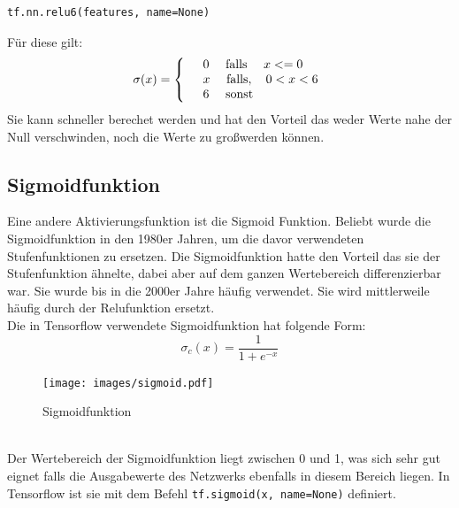 \begin{lstlisting}
tf.nn.relu6(features, name=None)
\end{lstlisting}
Für diese gilt:
\begin{align*}
	\sigma(x)=
	\left\{
	\begin{array}{l l}
		& 0 \quad \text{   falls  } \quad x <= 0  \\ 
		& x \quad \text{   falls},\quad 0 < x < 6 \\
		& 6 \quad \text{   sonst}
	\end{array}
	\right.
\end{align*}
Sie kann schneller berechet werden und hat den Vorteil das weder Werte nahe der Null verschwinden, noch die Werte zu gro\ss werden können.\cite{cookbook} 
\subsection{Sigmoidfunktion}
Eine andere Aktivierungsfunktion ist die Sigmoid Funktion. Beliebt wurde die Sigmoidfunktion in den 1980er Jahren, um die davor verwendeten Stufenfunktionen zu ersetzen. Die Sigmoidfunktion hatte den Vorteil das sie der Stufenfunktion ähnelte, dabei aber auf dem ganzen Wertebereich differenzierbar war. Sie wurde bis in die 2000er Jahre häufig verwendet. Sie wird mittlerweile häufig durch der Relufunktion ersetzt. \cite{Goodfellow} \\
Die in Tensorflow verwendete Sigmoidfunktion hat folgende Form:\cite{cookbook}
\begin{equation}
\sigma_c(x)=\frac{1}{1+e^{-x}}
\end{equation}
\begin{figure}[!htp]
	\centering
	\texttt{[image: images/sigmoid.pdf]}
	\caption{Sigmoidfunktion \cite{building}}
\end{figure}\\
Der Wertebereich der Sigmoidfunktion liegt zwischen 0 und 1, was sich sehr gut eignet falls die Ausgabewerte des Netzwerks ebenfalls in diesem Bereich liegen. In Tensorflow ist sie mit dem Befehl \lstinline$tf.sigmoid(x, name=None)$\cite{building}
definiert.
